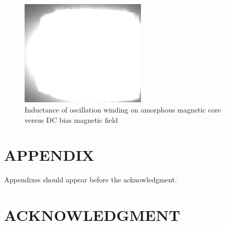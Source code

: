 \documentclass[letterpaper, 10 pt, conference]{ieeeconf}  %
\begin{document}
\begin{figure}[thpb]
\centering
\includegraphics[width=6cm]{./example_raw.png}
\caption{Inductance of oscillation winding on amorphous
magnetic core versus DC bias magnetic field}
\label{figurelabel}
\end{figure}
   
\addtolength{\textheight}{-12cm}   %







\section*{APPENDIX}

Appendixes should appear before the acknowledgment.

\section*{ACKNOWLEDGMENT}




\end{document}
